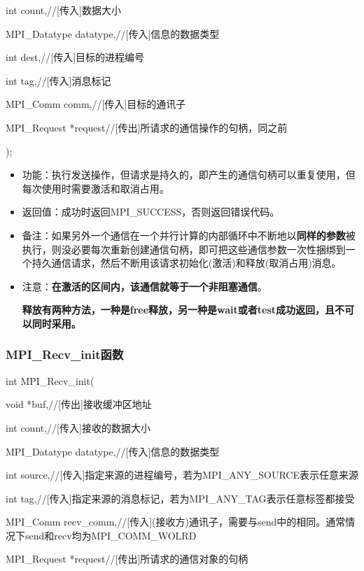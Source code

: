 \documentclass[UTF8]{article}%
\begin{document}
    \qquad int          count,//[传入]数据大小

    \qquad MPI\_Datatype datatype,//[传入]信息的数据类型

    \qquad int          dest,//[传入]目标的进程编号

    \qquad int          tag,//[传入]消息标记

    \qquad MPI\_Comm     comm,//[传入]目标的通讯子

    \qquad MPI\_Request  *request//[传出]所请求的通信操作的句柄，同之前

);

\begin{itemize}
    \item 功能：执行发送操作，但请求是持久的，即产生的通信句柄可以重复使用，但每次使用时需要激活和取消占用。
    \item 返回值：成功时返回MPI\_SUCCESS，否则返回错误代码。
    \item 备注：如果另外一个通信在一个并行计算的内部循环中不断地以\textbf{同样的参数}被执行，则没必要每次重新创建通信句柄，即可把这些通信参数一次性捆绑到一个持久通信请求，然后不断用该请求初始化(激活)和释放(取消占用)消息。
    \item 注意：\textbf{在激活的区间内，该通信就等于一个非阻塞通信}。
    
    \textbf{释放有两种方法，一种是free释放，另一种是wait或者test成功返回，且不可以同时采用。}
\end{itemize}

\subsubsection{MPI\_Recv\_init函数}

int MPI\_Recv\_init(

    \qquad void            *buf,//[传出]接收缓冲区地址

    \qquad int             count,//[传入]接收的数据大小

    \qquad MPI\_Datatype   datatype,//[传入]信息的数据类型

    \qquad int             source,//[传入]指定来源的进程编号，若为MPI\_ANY\_SOURCE表示任意来源

    \qquad int             tag,//[传入]指定来源的消息标记，若为MPI\_ANY\_TAG表示任意标签都接受

    \qquad MPI\_Comm       recv\_comm,//[传入](接收方)通讯子，需要与send中的相同。通常情况下send和recv均为MPI\_COMM\_WOLRD

    \qquad MPI\_Request  *request//[传出]所请求的通信对象的句柄
\end{document}
